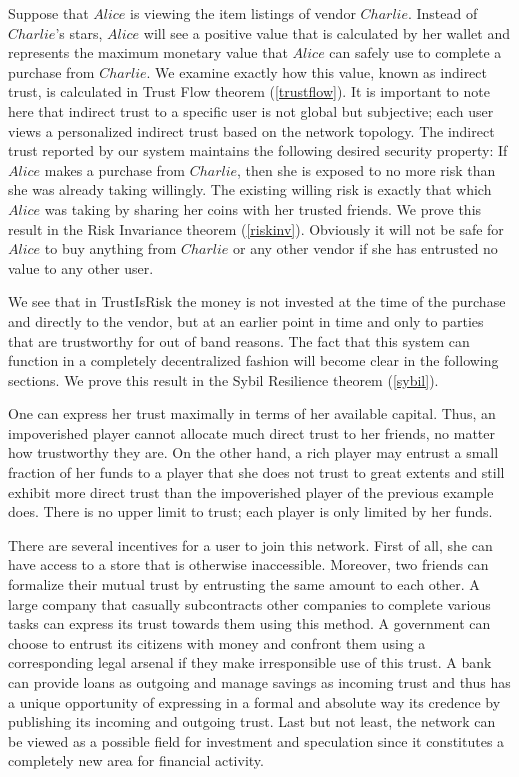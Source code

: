    Suppose that $Alice$ is viewing the item listings of vendor $Charlie$. Instead of $Charlie$'s stars, $Alice$ will see a
   positive value that is calculated by her wallet and represents the maximum monetary value that $Alice$ can safely use to
   complete a purchase from $Charlie$. We examine exactly how this value, known as indirect trust, is calculated in Trust
   Flow theorem (\ref{trustflow}). It is important to note here that indirect trust to a specific user is not global but
   subjective; each user views a personalized indirect trust based on the network topology. The indirect trust reported by
   our system maintains the following desired security property: If $Alice$ makes a purchase from $Charlie$, then she is
   exposed to no more risk than she was already taking willingly. The existing willing risk is exactly that which $Alice$
   was taking by sharing her coins with her trusted friends. We prove this result in the Risk Invariance theorem
   (\ref{riskinv}). Obviously it will not be safe for $Alice$ to buy anything from $Charlie$ or any other vendor if she has
   entrusted no value to any other user.

   We see that in TrustIsRisk the money is not invested at the time of the purchase and directly to the vendor, but at an
   earlier point in time and only to parties that are trustworthy for out of band reasons. The fact that this system can
   function in a completely decentralized fashion will become clear in the following sections. We prove this result in the
   Sybil Resilience theorem (\ref{sybil}).

   One can express her trust maximally in terms of her available capital. Thus, an impoverished player cannot allocate much
   direct trust to her friends, no matter how trustworthy they are. On the other hand, a rich player may entrust a small
   fraction of her funds to a player that she does not trust to great extents and still exhibit more direct trust than
   the impoverished player of the previous example does. There is no upper limit to trust; each player is only limited by
   her funds.

   There are several incentives for a user to join this network. First of all, she can have access to a store that is
   otherwise inaccessible. Moreover, two friends can formalize their mutual trust by entrusting the same amount to each
   other. A large company that casually subcontracts other companies to complete various tasks can express its trust
   towards them using this method. A government can choose to entrust its citizens with money and confront them using a
   corresponding legal arsenal if they make irresponsible use of this trust. A bank can provide loans as outgoing and
   manage savings as incoming trust and thus has a unique opportunity of expressing in a formal and absolute way its
   credence by publishing its incoming and outgoing trust. Last but not least, the network can be viewed as a possible
   field for investment and speculation since it constitutes a completely new area for financial activity.

